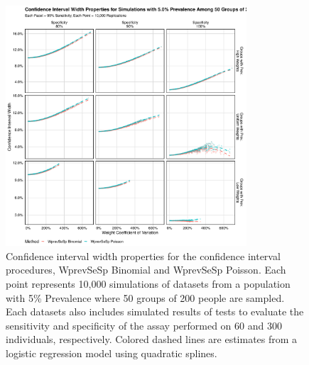 \documentclass[AMA,STIX1COL]{WileyNJD-v2}
\begin{document}
\begin{figure}
\centering
\includegraphics[width=0.8\textwidth]{figures/imperfect_confidence_interval_width_50_groups_0_05_prev}
\caption{Confidence interval width properties for the confidence interval procedures, WprevSeSp Binomial and WprevSeSp Poisson.
Each point represents 10,000 simulations of datasets from a population with 5\% Prevalence where 50 groups of 200 people are sampled.
Each datasets also includes simulated results of tests to evaluate the sensitivity and specificity of the assay performed on 60 and 300 individuals, respectively.
Colored dashed lines are estimates from a logistic regression model using quadratic splines.}
\label{fig:imperfect_confidence_interval_width_50_groups_0_05_prev}
\end{figure}
\end{document}
